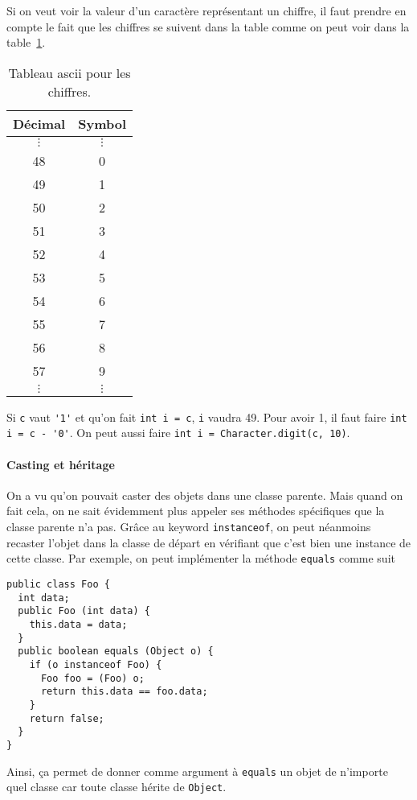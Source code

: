 Si on veut voir la valeur d'un caractère représentant un chiffre,
il faut prendre en compte le fait que les chiffres se suivent dans la table
comme on peut voir dans la table~\ref{tab:ascii}.
\begin{table}
  \centering
  \begin{tabular}{|c|c|}
    \hline
    Décimal & Symbol\\
    \hline
    $\vdots$ & $\vdots$\\
    \hline
    48 & 0\\
    \hline
    49 & 1\\
    \hline
    50 & 2\\
    \hline
    51 & 3\\
    \hline
    52 & 4\\
    \hline
    53 & 5\\
    \hline
    54 & 6\\
    \hline
    55 & 7\\
    \hline
    56 & 8\\
    \hline
    57 & 9\\
    \hline
    $\vdots$ & $\vdots$\\
    \hline
  \end{tabular}
  \caption{Tableau ascii pour les chiffres.}
  \label{tab:ascii}
\end{table}
Si \lstinline|c| vaut \lstinline|'1'| et qu'on fait \lstinline|int i = c|,
\lstinline|i| vaudra 49.
Pour avoir 1, il faut faire \lstinline|int i = c - '0'|.
On peut aussi faire \lstinline|int i = Character.digit(c, 10)|.

\paragraph{Casting et héritage}
\label{sec:cast_class}
On a vu qu'on pouvait caster des objets dans une classe parente.
Mais quand on fait cela, on ne sait évidemment plus appeler ses méthodes
spécifiques que la classe parente n'a pas.
Grâce au keyword \lstinline|instanceof|, on peut néanmoins recaster l'objet
dans la classe de départ en vérifiant que c'est bien une instance de cette
classe.
Par exemple, on peut implémenter la méthode \lstinline|equals| comme suit
\begin{lstlisting}
public class Foo {
  int data;
  public Foo (int data) {
    this.data = data;
  }
  public boolean equals (Object o) {
    if (o instanceof Foo) {
      Foo foo = (Foo) o;
      return this.data == foo.data;
    }
    return false;
  }
}
\end{lstlisting}
Ainsi, ça permet de donner comme argument à \lstinline|equals| un objet de
n'importe quel classe car toute classe hérite de \lstinline|Object|.


